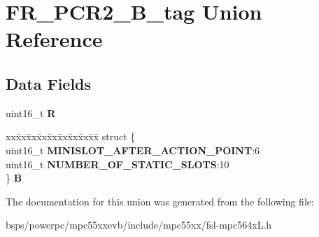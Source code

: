 \hypertarget{unionFR__PCR2__16B__tag}{}\section{F\+R\+\_\+\+P\+C\+R2\+\_\+B\+\_\+tag Union Reference}
\label{unionFR__PCR2__16B__tag}
\subsection*{Data Fields}
\begin{DoxyCompactItemize}
\item 
\mbox{\label{unionFR__PCR2__16B__tag_a2e534be503c992ca684c9de061fa6a1f}} 
uint16\+\_\+t {\bfseries R}
\item 
\mbox{\label{unionFR__PCR2__16B__tag_a614d5345466727707e56a85404c7fcd5}} 
\begin{tabbing}
xx\=xx\=xx\=xx\=xx\=xx\=xx\=xx\=xx\=\kill
struct \{\\
\>uint16\_t {\bfseries MINISLOT\_AFTER\_ACTION\_POINT}:6\\
\>uint16\_t {\bfseries NUMBER\_OF\_STATIC\_SLOTS}:10\\
\} {\bfseries B}\\

\end{tabbing}\end{DoxyCompactItemize}


The documentation for this union was generated from the following file\+:\begin{DoxyCompactItemize}
\item 
bsps/powerpc/mpc55xxevb/include/mpc55xx/fsl-\/mpc564x\+L.\+h\end{DoxyCompactItemize}
